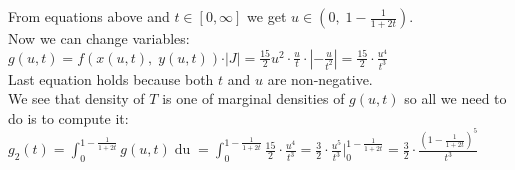\documentclass[a4paper,12pt] {article}
\begin{document}
From equations above and \(t\in [0, \infty]\) we get \(\displaystyle u\in (0,\; 1 - \frac{1}{1+2t})\).\\

Now we can change variables: \\
\(\displaystyle g(u, t) = f(x(u,t),\; y(u, t)) \cdot \vert J \vert = \frac{15}{2} u^2 \cdot \frac{u}{t} \cdot \left\vert-\frac{u}{t^2}\right\vert = \frac{15}{2} \cdot \frac{u^4}{t^3} \)\\
Last equation holds because both $t$ and $u$ are non-negative. \\
We see that density of \(T\) is one of marginal densities of \(g(u, t)\) so all we need to do is to compute it: \\
\(\displaystyle g_2(t) = \int_0^{1-\frac{1}{1+2t}} g(u, t) \mathop{du} = 
\int_0^{1-\frac{1}{1+2t}} \frac{15}{2}\cdot \frac{u^4}{t^3} = \frac{3}{2} \cdot \frac{u^5}{t^3} \Bigg|_0^{1-\frac{1}{1+2t}} = \frac{3}{2} \cdot \frac{(1-\frac{1}{1+2t})^5}{t^3} \)
\end{document}
